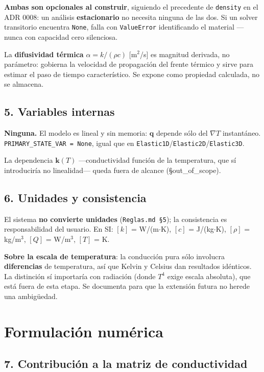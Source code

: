 \documentclass[11pt,letterpaper,oneside]{report}
\begin{document}
\textbf{Ambas son opcionales al construir}, siguiendo el precedente de \texttt{density} en el ADR 0008: un análisis \textbf{estacionario} no necesita ninguna de las dos. Si un solver transitorio encuentra \texttt{None}, falla con \texttt{ValueError} identificando el material --- nunca con capacidad cero silenciosa.

La \textbf{difusividad térmica} $\alpha = k/(\rho c)$ [m\ensuremath{^{2}}/s] es magnitud derivada, no parámetro: gobierna la velocidad de propagación del frente térmico y sirve para estimar el paso de tiempo característico. Se expone como propiedad calculada, no se almacena.

\subsection{5. Variables internas}

\textbf{Ninguna.} El modelo es lineal y sin memoria: $\mathbf q$ depende sólo del $\nabla T$ instantáneo. \texttt{PRIMARY\_STATE\_VAR = None}, igual que en \texttt{Elastic1D}/\texttt{Elastic2D}/\texttt{Elastic3D}.

La dependencia $\mathbf k(T)$ ---conductividad función de la temperatura, que sí introduciría no linealidad--- queda fuera de alcance (§out\_of\_scope).

\subsection{6. Unidades y consistencia}

El sistema \textbf{no convierte unidades} (\texttt{Reglas.md §5}); la consistencia es responsabilidad del usuario. En SI: $[k]$ = W/(m\ensuremath{\cdot}K), $[c]$ = J/(kg\ensuremath{\cdot}K), $[\rho]$ = kg/m\ensuremath{^{3}}, $[Q]$ = W/m\ensuremath{^{3}}, $[T]$ = K.

\textbf{Sobre la escala de temperatura}: la conducción pura sólo involucra \textbf{diferencias} de temperatura, así que Kelvin y Celsius dan resultados idénticos. La distinción sí importaría con radiación (donde $T^4$ exige escala absoluta), que está fuera de esta etapa. Se documenta para que la extensión futura no herede una ambigüedad.


\section{Formulación numérica}

\subsection{7. Contribución a la matriz de conductividad}
\end{document}
